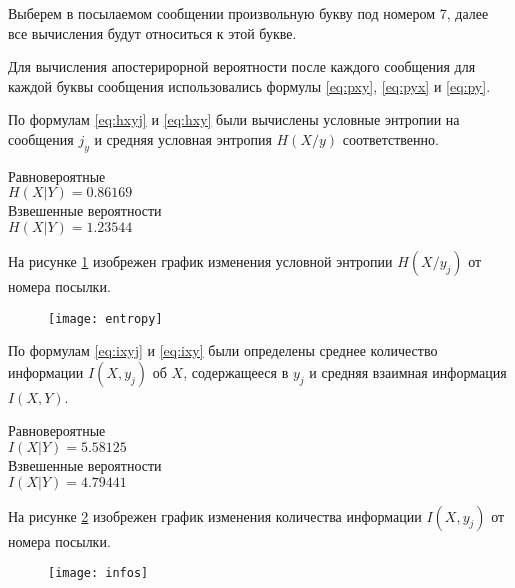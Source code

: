 Выберем в посылаемом сообщении произвольную букву под номером 7, далее все вычисления будут относиться к этой букве.

Для вычисления апостерирорной вероятности после каждого сообщения для каждой буквы сообщения использовались формулы \ref{eq:pxy}, \ref{eq:pyx} и \ref{eq:py}.

По формулам \ref{eq:hxyj} и \ref{eq:hxy} были вычислены условные энтропии на сообщения $j_y$ и средняя условная энтропия $H(X/y)$ соответственно. 

\begin{multicols}{2}
\begin{center}
Равновероятные\\
$H(X|Y) = 0.86169$\\
Взвешенные вероятности\\
$H(X|Y) = 1.23544$
\end{center}
\end{multicols}

На рисунке \ref{plt:entropy} изобрежен график изменения условной энтропии $H(X/y_j)$ от номера посылки.

\begin{figure}[H]
\begin{center}
	\vspace{-0.5cm}
	\texttt{[image: entropy]}
	\caption{}
	\label{plt:entropy}
	\vspace{-0.5cm}
\end{center}
\end{figure}

По формулам \ref{eq:ixyj} и \ref{eq:ixy} были определены среднее количество информации $I(X, y_j)$ об $X$, содержащееся в $y_j$ и средняя взаимная информация $I(X, Y)$.

\begin{multicols}{2}
\begin{center}
Равновероятные\\
$I(X|Y) = 5.58125$\\
Взвешенные вероятности\\
$I(X|Y) = 4.79441$
\end{center}
\end{multicols}

На рисунке \ref{plt:info} изобрежен график изменения количества
информации $I(X, y_j)$ от номера посылки.

\begin{figure}[H]
\begin{center}
	\vspace{-0.5cm}
	\texttt{[image: infos]}
	\caption{}
	\label{plt:info}
	\vspace{-0.5cm}
\end{center}
\end{figure}

